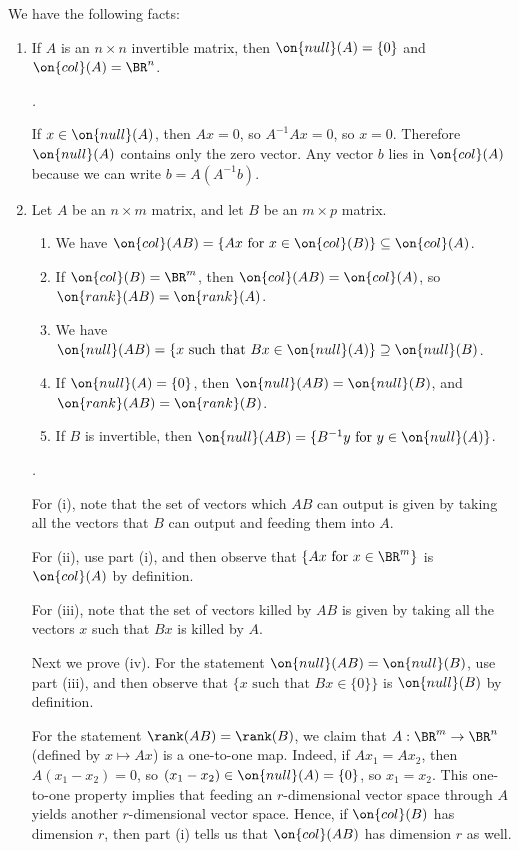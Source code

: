 \documentclass[10pt]{amsart}
\makeatletter
\renewenvironment{proof}[1][\proofname]{\par
	\pushQED{\qed}%
	\normalfont \topsep6\p@\@plus6\p@\relax
	\noindent\emph{#1.} 
	\ignorespaces
}{%
\popQED\endtrivlist\@endpefalse
}
\theoremstyle{mythm}
\theoremstyle{definition}
\theoremstyle{myrmk}
\newenvironment{myproof}{\color{blue}\begin{proof}}{\end{proof}}
\makeatother
\begin{document}
	We have the following facts: 
	\begin{enumerate}[label=(\arabic*)]
		\item If $A$ is an $n \times n$ invertible matrix, then $\on{null}(A) = \{0\}$ and $\on{col}(A) = \BR^n$. 
		\begin{myproof}
			If $x \in \on{null}(A)$, then $Ax = 0$, so $A^{-1}Ax = 0$, so $x = 0$. Therefore $\on{null}(A)$ contains only the zero vector. Any vector $b$ lies in $\on{col}(A)$ because we can write $b = A(A^{-1}b)$. 
		\end{myproof}
		\item Let $A$ be an $n \times m$ matrix, and let $B$ be an $m \times p$ matrix. 
		\begin{enumerate}[label=(\roman*)]
			\item We have $\on{col}(AB) = \{Ax \text{ for } x \in \on{col}(B)\} \subseteq \on{col}(A)$. 
			\item If $\on{col}(B) = \BR^m$, then $\on{col}(AB) = \on{col}(A)$, so $\on{rank}(AB) = \on{rank}(A)$. 
			\item We have $\on{null}(AB) = \{x \text{ such that } Bx \in \on{null}(A)\} \supseteq \on{null}(B)$. 
			\item If $\on{null}(A) = \{0\}$, then $\on{null}(AB) = \on{null}(B)$, and $\on{rank}(AB) = \on{rank}(B)$. 
			\item If $B$ is invertible, then $\on{null}(AB) = \{B^{-1}y \text{ for } y \in \on{null}(A)\}$. 
		\end{enumerate}
		\begin{myproof}
			For (i), note that the set of vectors which $AB$ can output is given by taking all the vectors that $B$ can output and feeding them into $A$. 
			
			For (ii), use part (i), and then observe that $\{Ax \text{ for } x \in \BR^m\}$ is $\on{col}(A)$ by definition. 
			
			For (iii), note that the set of vectors killed by $AB$ is given by taking all the vectors $x$ such that $Bx$ is killed by $A$. 
			
			Next we prove (iv). For the statement $\on{null}(AB) = \on{null}(B)$, use part (iii), and then observe that $\{x \text{ such that } Bx \in \{0\}\}$ is $\on{null}(B)$ by definition. 
			
			For the statement $\rank(AB) = \rank(B)$, we claim that $A : \BR^m \to \BR^n$ (defined by $x \mapsto Ax$) is a one-to-one map. Indeed, if $Ax_1 = Ax_2$, then $A(x_1 - x_2) = 0$, so $(x_1 - x_2) \in \on{null}(A) = \{0\}$, so $x_1 = x_2$. This one-to-one property implies that feeding an $r$-dimensional vector space through $A$ yields another $r$-dimensional vector space. Hence, if $\on{col}(B)$ has dimension $r$, then part (i) tells us that $\on{col}(AB)$ has dimension $r$ as well. 
			

\end{myproof}
\end{enumerate}
\end{document}
